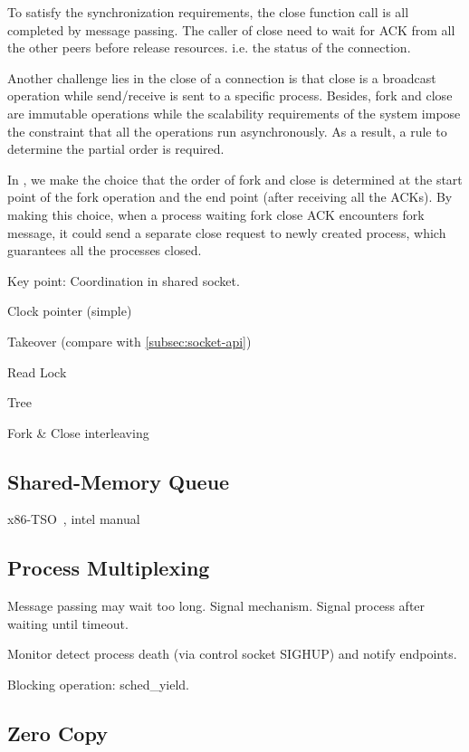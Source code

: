 To satisfy the synchronization requirements, the close function call is all completed by message passing. The caller of close need to wait for ACK from all the other peers before release resources. i.e. the status of the connection.

Another challenge lies in the close of a connection is that close is a broadcast operation while send/receive is sent to a specific process. Besides, fork and close are immutable operations while the scalability requirements of the system impose the constraint that all the operations run asynchronously. As a result, a rule to determine the partial order is required.

In \libipc, we make the choice that the order of fork and close is determined at the start point of the fork operation and the end point (after receiving all the ACKs). By making this choice, when a process waiting fork close ACK encounters fork message, it could send a separate close request to newly created process, which guarantees all the processes closed.
  
Key point: Coordination in shared socket.

Clock pointer (simple)

Takeover (compare with \ref{subsec:socket-api})

Read Lock

Tree

Fork \& Close interleaving

\subsection{Shared-Memory Queue}

x86-TSO~\cite{sewell2010x86}, intel manual~\cite{intel-manual}

\subsection{Process Multiplexing}
\label{subsec:epoll}


Message passing may wait too long.
Signal mechanism. Signal process after waiting until timeout.

Monitor detect process death (via control socket SIGHUP) and notify endpoints.

Blocking operation: sched\_yield.


\subsection{Zero Copy}
\label{subsec:zerocopy}

